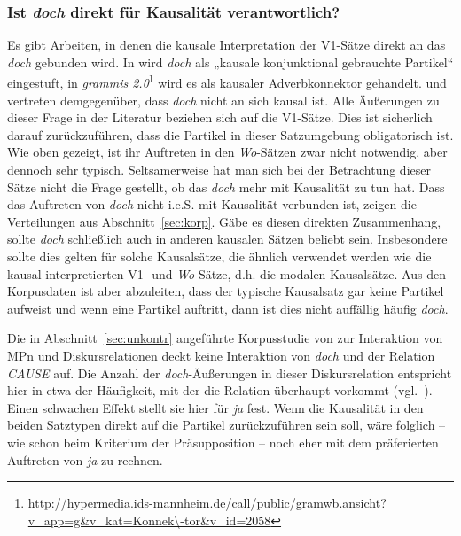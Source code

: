\subsubsection{Ist \textit{doch} direkt für Kausalität verantwortlich?}	
Es gibt Arbeiten, in denen die kausale Interpretation der V1-Sätze direkt an das \textit{doch} gebunden wird. In \citet[59]{Koenig1990} wird \textit{doch} als „kausale konjunktional gebrauchte Partikel“ eingestuft, in \textit{grammis 2.0}\footnote{\url{http://hypermedia.ids-mannheim.de/call/public/gramwb.ansicht?v\_app=g\&v\_kat=Konnek\-tor\&v\_id=2058}} wird es als kausa\-ler Adverbkonnektor gehandelt. \citet[168]{Oennerfors1997} und \citet[170]{Pittner2011} vertre\-ten demgegenüber, dass \textit{doch} nicht an sich kausal ist. Alle Äußerungen zu dieser Frage in der Literatur beziehen sich auf die V1-Sätze. Dies ist sicherlich darauf zurückzuführen, dass die Partikel in dieser Satzumgebung obligatorisch ist. Wie oben gezeigt, ist ihr Auftreten in den \textit{Wo}-Sätzen zwar nicht notwendig, aber dennoch sehr typisch. Seltsamerweise hat man sich bei der Betrachtung dieser Sätze nicht die Frage gestellt, ob das \textit{doch} mehr mit Kausalität zu tun hat. Dass das Auftreten von \textit{doch} nicht i.e.S. mit Kausalität verbunden ist, zeigen die Verteilungen aus Abschnitt~\ref{sec:korp}. Gäbe es diesen direkten Zusammenhang, sollte \textit{doch} schließlich auch in anderen kausalen Sätzen beliebt sein. Insbesondere sollte dies gelten für solche Kausalsätze, die ähnlich verwendet werden wie die kausal interpretierten V1- und \textit{Wo}-Sätze, d.h. die  modalen Kausalsätze. Aus den Korpusdaten ist aber abzuleiten, dass der typische Kausalsatz gar keine Partikel aufweist und wenn eine Partikel auftritt, dann ist dies nicht auffällig häufig \textit{doch}. 

Die in Abschnitt~\ref{sec:unkontr} angeführte Korpusstudie von \citet{Doering2014} zur Interaktion von MPn und Diskursrelationen deckt keine Interaktion von \textit{doch} und der Relation \textit{CAUSE} auf. Die Anzahl der \textit{doch}-Äußerungen in dieser Diskursrelation entspricht hier in etwa der Häufigkeit, mit der die Relation überhaupt vorkommt (vgl.\ \citeyear[88]{Doering2014}). Einen schwachen Effekt stellt sie hier für \textit{ja} fest. Wenn die Kausali\-tät in den beiden Satztypen direkt auf die Partikel zurückzuführen sein soll, wäre folglich – wie schon beim Kriterium der Präsupposition – noch eher mit dem präferierten Auftreten von \textit{ja} zu rechnen. 

